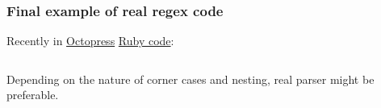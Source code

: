 \begin{frame}[fragile]
  \frametitle{Final example of real regex code}

  Recently in \href{http://octopress.org/}{Octopress} \href{https://github.com/imathis/octopress/blob/3bb4a14212b226d1da3acd546584d7117557a1ae/lib/octopress/liquid\_helpers/conditional.rb}{Ruby code}:

  \inputminted{ruby}{extra/conditional.rb}

  Depending on the nature of corner cases and nesting, real parser might be preferable.
\end{frame}
